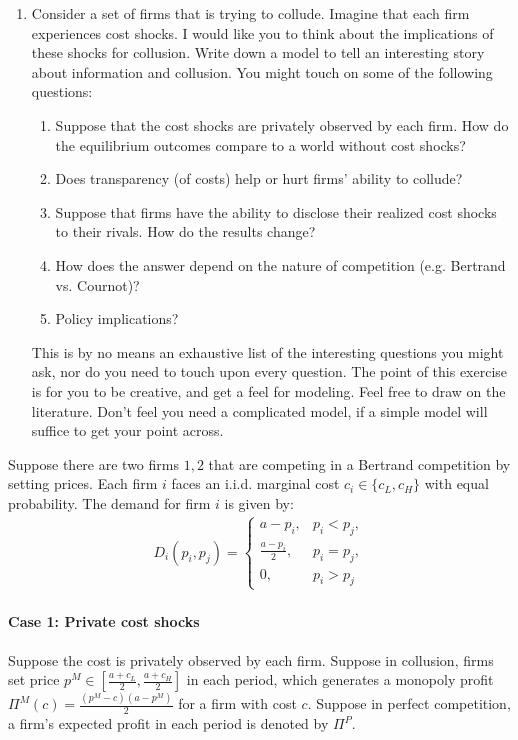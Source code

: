 \documentclass[12pt]{article}
\begin{document}
\begin{enumerate}
\item Consider a set of firms that is trying to collude. Imagine that each firm experiences cost shocks. I would like you to think about the implications of these shocks for collusion. Write down a model to tell an interesting story about information and collusion. You might touch on some of the following questions:
    \begin{enumerate}
        \item Suppose that the cost shocks are privately observed by each firm. How do the equilibrium outcomes compare to a world without cost shocks?
        \item Does transparency (of costs) help or hurt firms’ ability to collude?
        \item Suppose that firms have the ability to disclose their realized cost shocks to their rivals. How do the results change?
        \item How does the answer depend on the nature of competition (e.g. Bertrand vs. Cournot)?
        \item Policy implications?
    \end{enumerate}
    This is by no means an exhaustive list of the interesting questions you might ask, nor do you need to touch upon every question. The point of this exercise is for you to be creative, and get a feel for modeling. Feel free to draw on the literature. Don't feel you need a complicated model, if a simple model will suffice to get your point across.
\end{enumerate}

Suppose there are two firms $1,2$ that are competing in a Bertrand competition by setting prices. Each firm $i$ faces an i.i.d. marginal cost $c_i\in \{c_L,c_H\}$ with equal probability. The demand for firm $i$ is given by:
\begin{equation}
    \begin{aligned}
        D_i(p_i,p_j)=\left\{\begin{matrix}
            a-p_i,& p_i<p_j,\\
            \frac{a-p_i}{2},& p_i=p_j,\\
            0,& p_i>p_j
        \end{matrix}\right.
    \end{aligned}
    \nonumber
\end{equation}

\paragraph{Case 1: Private cost shocks}
Suppose the cost is privately observed by each firm. Suppose in collusion, firms set price $p^M\in\left[\frac{a+c_L}{2},\frac{a+c_H}{2}\right]$ in each period, which generates a monopoly profit $\Pi^M(c)=\frac{(p^M-c)(a-p^M)}{2}$ for a firm with cost $c$. Suppose in perfect competition, a firm's expected profit in each period is denoted by $\Pi^P$.
\end{document}
